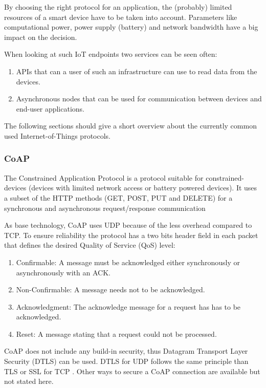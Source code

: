 By choosing the right protocol for an application, the (probably) limited resources of a smart device have to be taken into account. Parameters like computational power, power supply (battery) and network bandwidth have a big impact on the decision\cite{iotprotocols}.  

When looking at such IoT endpoints two services can be seen often\cite{iotprotocols}:

\begin{enumerate}
	\item APIs that can a user of such an infrastructure can use to read data from the devices.
	\item Asynchronous nodes that can be used for communication between devices and end-user applications.
\end{enumerate}

The following sections should give a short overview about the currently common used Internet-of-Things protocols\cite{iotprotocols}.

\subsubsection{CoAP}
The Constrained Application Protocol is a protocol suitable for constrained-devices (devices with limited network access or battery powered devices). It uses a subset of the HTTP methods (GET, POST, PUT and DELETE) for a synchronous and asynchronous request/response communication

As base technology, CoAP uses UDP because of the less overhead compared to TCP. To ensure reliability the protocol has a two bits header field in each packet that defines the desired Quality of Service (QoS) level:

\begin{enumerate}
	\item Confirmable: A message must be acknowledged either synchronously or asynchronously with an ACK.
	\item Non-Confirmable: A message needs not to be acknowledged.
	\item Acknowledgment: The acknowledge message for a request has has to be acknowledged.
	\item Reset: A message stating that a request could not be processed.
\end{enumerate}

CoAP does not include any build-in security, thus Datagram Transport Layer Security (DTLS) can be used. DTLS for UDP follows the same principle than TLS or SSL for TCP . Other ways to secure a CoAP connection are available but not stated here.

